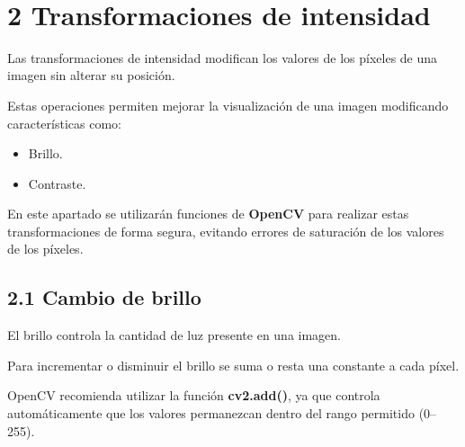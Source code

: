 \documentclass[11pt]{article}
\providecommand{\tightlist}{%
      \setlength{\itemsep}{0pt}\setlength{\parskip}{0pt}}
\begin{document}
    \begin{center}
    \end{center}
    { \hspace*{\fill} \\}
    
    \section{2 Transformaciones de
intensidad}\label{transformaciones-de-intensidad}

Las transformaciones de intensidad modifican los valores de los píxeles
de una imagen sin alterar su posición.

Estas operaciones permiten mejorar la visualización de una imagen
modificando características como:

\begin{itemize}
\tightlist
\item
  Brillo.
\item
  Contraste.
\end{itemize}

En este apartado se utilizarán funciones de \textbf{OpenCV} para
realizar estas transformaciones de forma segura, evitando errores de
saturación de los valores de los píxeles.

    \subsection{2.1 Cambio de brillo}\label{cambio-de-brillo}

El brillo controla la cantidad de luz presente en una imagen.

Para incrementar o disminuir el brillo se suma o resta una constante a
cada píxel.

OpenCV recomienda utilizar la función \textbf{cv2.add()}, ya que
controla automáticamente que los valores permanezcan dentro del rango
permitido (0--255).
\end{document}
